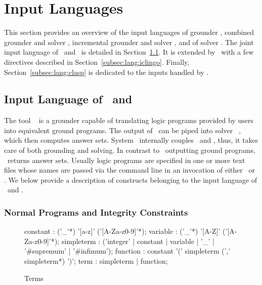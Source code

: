\section{Input Languages}\label{sec:language}

This section provides an overview of the input languages of
grounder \gringo, combined grounder and solver \clingo,
incremental grounder and solver \iclingo, and of solver \clasp.
The joint input language of \gringo\ and \clingo\ is detailed in
Section~\ref{subsec:lang:gringo}.
It is extended by \iclingo\ with a few directives described in Section~\ref{subsec:lang:iclingo}.
Finally, Section~\ref{subsec:lang:clasp} is dedicated to the inputs
handled by \clasp.


\subsection{Input Language of \gringo\ and \clingo}\label{subsec:lang:gringo}

The tool \gringo~\cite{gescth07a} is a grounder capable of translating
logic programs provided by users into equivalent ground programs.
The output of \gringo\ can be piped into solver \clasp~\cite{gekanesc07b},
which then computes answer sets.
System \clingo\ internally couples \gringo\ and \clasp, thus,
it takes care of both grounding and solving.
In contrast to \gringo\ outputting ground programs, 
\clingo\ returns answer sets.
Usually logic programs are specified in one or more text files whose names are passed via the command line
in an invocation of either \gringo\ or \clingo.
We below provide a description of constructs belonging to the input language of \gringo\ and \clingo.


\subsubsection{Normal Programs and Integrity Constraints}\label{subsec:gringo:normal}

\begin{figure}
\begin{rail}
	constant    : ('\_'*) '[a-z]' ('[A-Za-z0-9]'*);
	variable    : ('\_'*) '[A-Z]' ('[A-Za-z0-9]'*);
	simpleterm  : ('integer' | constant | variable | '\_' | '\#supremum' | '\#infimum');
	function    : constant '(' simpleterm (',' simpleterm*) ')';
	term        : simpleterm | function;
\end{rail}
\caption{Terms\label{fig:terms}}
\end{figure}

